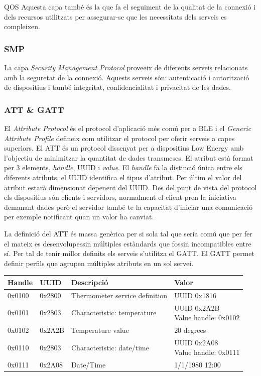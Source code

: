 QOS Aquesta capa també és la que fa el seguiment de la qualitat de la connexió i dels recursos utilitzats per assegurar-se que les necessitats dels serveis es compleixen.

\subsubsection{SMP}
La capa \textit{Security Management Protocol} proveeix de diferents serveis relacionats amb la seguretat de la connexió.
Aquests serveis són: autenticació i autorització de dispositius i també integritat, confidencialitat i privacitat de les dades.


\subsubsection{ATT \& GATT}
El \textit{Attribute Protocol} és el protocol d'aplicació més comú per a BLE i el \textit{Generic Attribute Profile} defineix com utilitzar el protocol per oferir serveis a capes superiors.
El ATT és un protocol dissenyat per a dispositius Low Energy amb l'objectiu de minimitzar la quantitat de dades transmeses. El atribut està format per 3 elements, \textit{handle}, UUID  i \textit{value}. El \textit{handle} fa la distinció única entre els diferents atributs, el UUID identifica el tipus d'atribut. Per últim el valor del atribut estarà dimensionat depenent del UUID.
Des del punt de vista del protocol els dispositius són clients i servidors, normalment el client pren la iniciativa demanant dades però el servidor també te la capacitat d'iniciar una comunicació per exemple notificant quan un valor ha canviat.

La definició del ATT és massa genèrica per si sola tal que seria comú que per fer el mateix es desenvolupessin múltiples estàndards que fossin incompatibles entre sí.
Per tal de tenir millor definits els serveis s'utilitza el GATT. El GATT permet definir perfils que agrupen múltiples atributs en un sol servei.
\begin{center}
	\begin{tabular}{|l|l|l|l|}
		\hline
		Handle	&	UUID	&	Descripció						&	Valor		\\ 	\hline
		0x0100	&	0x2800	&	Thermometer service definition	&	UUID 0x1816	\\		\hline
		0x0101	&	0x2803	&	Characteristic: temperature		&	\parbox[t]{4cm}{UUID 0x2A2B	\\ Value handle: 0x0102}	\\	\hline
		0x0102	&	0x2A2B	&	Temperature value				&	20 degrees	\\	\hline
		0x0110	&	0x2803	&	Characteristic: date/time		&	\parbox[t]{4cm}{UUID 0x2A08	\\ Value handle: 0x0111}	\\		\hline
		0x0111	&	0x2A08	&	Date/Time						&	1/1/1980 12:00	\\
		\hline
	\end{tabular}
\end{center}


